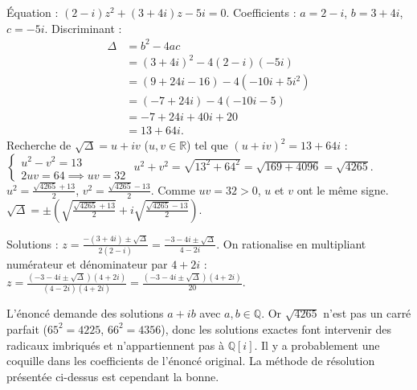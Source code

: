 \documentclass[11pt]{article}
\begin{document}
\begin{corrige}
Équation : $(2-i)z^2 + (3+4i)z - 5i = 0$.
Coefficients : $a = 2-i$, $b = 3+4i$, $c = -5i$.
Discriminant :
\begin{align*}
\Delta &= b^2 - 4ac \\
&= (3+4i)^2 - 4(2-i)(-5i) \\
&= (9 + 24i - 16) - 4(-10i + 5i^2) \\
&= (-7 + 24i) - 4(-10i - 5) \\
&= -7 + 24i + 40i + 20 \\
&= 13 + 64i.
\end{align*}
Recherche de $\sqrt{\Delta} = u+iv$ ($u,v \in \mathbb{R}$) tel que $(u+iv)^2 = 13+64i$ :
$\begin{cases} u^2 - v^2 = 13 \\ 2uv = 64 \implies uv = 32 \end{cases}$
$u^2 + v^2 = \sqrt{13^2 + 64^2} = \sqrt{169 + 4096} = \sqrt{4265}$.
$u^2 = \frac{\sqrt{4265} + 13}{2}$, $v^2 = \frac{\sqrt{4265} - 13}{2}$.
Comme $uv=32>0$, $u$ et $v$ ont le même signe.
$\sqrt{\Delta} = \pm \left( \sqrt{\frac{\sqrt{4265}+13}{2}} + i \sqrt{\frac{\sqrt{4265}-13}{2}} \right)$.

Solutions :
$z = \frac{-(3+4i) \pm \sqrt{\Delta}}{2(2-i)} = \frac{-3-4i \pm \sqrt{\Delta}}{4-2i}$.
On rationalise en multipliant numérateur et dénominateur par $4+2i$ :
$z = \frac{(-3-4i \pm \sqrt{\Delta})(4+2i)}{(4-2i)(4+2i)} = \frac{(-3-4i \pm \sqrt{\Delta})(4+2i)}{20}$.

\begin{attention}
L'énoncé demande des solutions $a+ib$ avec $a,b \in \mathbb{Q}$. Or $\sqrt{4265}$ n'est pas un carré parfait ($65^2=4225$, $66^2=4356$), donc les solutions exactes font intervenir des radicaux imbriqués et n'appartiennent pas à $\mathbb{Q}[i]$. Il y a probablement une coquille dans les coefficients de l'énoncé original. La méthode de résolution présentée ci-dessus est cependant la bonne.
\end{attention}
\end{corrige}
\end{document}
